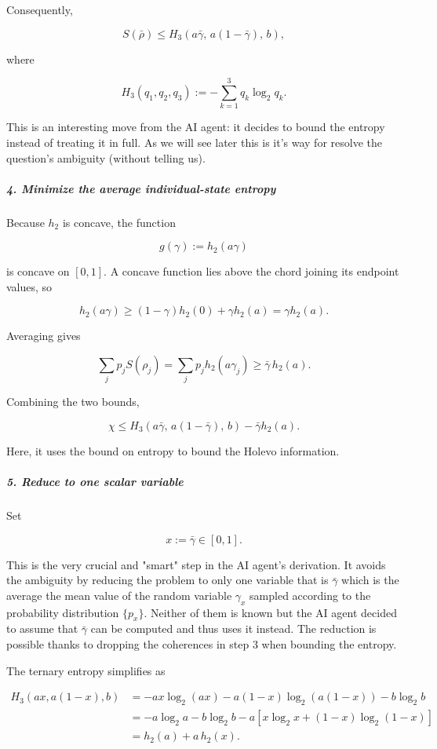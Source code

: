 Consequently,

\[
S(\bar\rho) \leq H_3\!\left( a\bar\gamma,\, a(1-\bar\gamma),\, b \right),
\]

where

\[
H_3(q_1,q_2,q_3):=-\sum_{k=1}^3q_k\log_2q_k.
\]

{
\color{blue}
This is an interesting move from the AI agent: it decides to bound the entropy instead of treating it in full. As we will see later this is it's way for resolve the question's ambiguity (without telling us).
}

\subparagraph*{4. Minimize the average individual-state entropy}

Because $h_2$ is concave, the function

\[
g(\gamma):=h_2(a\gamma)
\]

is concave on $[0,1]$. A concave function lies above the chord joining its endpoint values, so

\[
h_2(a\gamma) \geq (1-\gamma)h_2(0)+\gamma h_2(a) = \gamma h_2(a).
\]

Averaging gives

\[
\sum_jp_jS(\rho_j) = \sum_jp_jh_2(a\gamma_j) \geq \bar\gamma\,h_2(a).
\]

Combining the two bounds,

\[
\chi \leq H_3\!\left( a\bar\gamma,\, a(1-\bar\gamma),\, b \right) -\bar\gamma h_2(a).
\]

{
\color{blue}
Here, it uses the bound on entropy to bound the Holevo information.
}


\subparagraph*{5. Reduce to one scalar variable}

Set

\[
x:=\bar\gamma\in[0,1].
\]

{
\color{blue}
This is the very crucial and "smart" step in the AI agent's derivation. It avoids the ambiguity by reducing the problem to only one variable that is $\bar\gamma$ which is the average the mean value of the random variable $\gamma_x$ sampled according to the probability distribution $\{p_x\}$. Neither of them is known but the AI agent decided to assume that $\bar\gamma$ can be computed and thus uses it instead. The reduction is possible thanks to dropping the coherences in step 3 when bounding the entropy. 
}


The ternary entropy simplifies as

\[
\begin{aligned}
H_3\left(ax,a(1-x),b\right)
&=-ax\log_2(ax)-a(1-x)\log_2(a(1-x))-b\log_2b\\
&=-a\log_2a-b\log_2b
-a\left[x\log_2x+(1-x)\log_2(1-x)\right]\\
&=h_2(a)+a\,h_2(x).
\end{aligned}
\]

